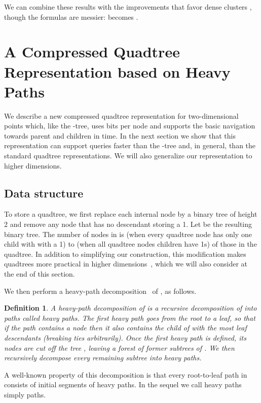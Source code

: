 \documentclass{elsarticle}
\newtheorem{definition}{Definition}
\begin{document}
We can combine these results with the improvements that favor dense clusters \cite{Nav16}, though the formulas are messier:  becomes .


\section{A Compressed Quadtree Representation based on Heavy Paths}
\label{sec:structure}



We describe a new compressed quadtree representation for two-dimensional points which, like the -tree, uses  bits per node and supports the basic navigation towards parent and children in  time. In the next section we show that this representation can support queries faster than the -tree and, in general, than the standard quadtree representations. We will also generalize our representation to higher dimensions.

\subsection{Data structure}

To store a quadtree, we first replace each internal node by a binary tree of height 2 and remove any node that has no descendant storing a 1. Let  be the resulting binary tree. The number of nodes in  is  (when every quadtree node has only one child with with a 1) to  (when all quadtree nodes children have 1s) of those in the quadtree. In addition to simplifying our construction, this modification makes quadtrees more practical in higher dimensions~\cite{BDNR14}, which we will also consider at the end of this section.

We then perform a heavy-path decomposition~\cite{ST83} of , as follows.

\begin{definition}
A heavy-path decomposition of  is a recursive decomposition of  into paths called {\em heavy paths}. The first heavy path goes from the root to a leaf, so that if the path contains a node  then it also contains the child of  with the most leaf descendants (breaking ties arbitrarily). Once the first heavy path is defined, its nodes are cut off the tree , leaving a forest of former subtrees of . We then recursively decompose every remaining subtree into heavy paths.
\end{definition}

A well-known property of this decomposition is that every root-to-leaf path in  consists of  initial segments of heavy paths. 
In the sequel we call heavy paths simply paths.
\end{document}
